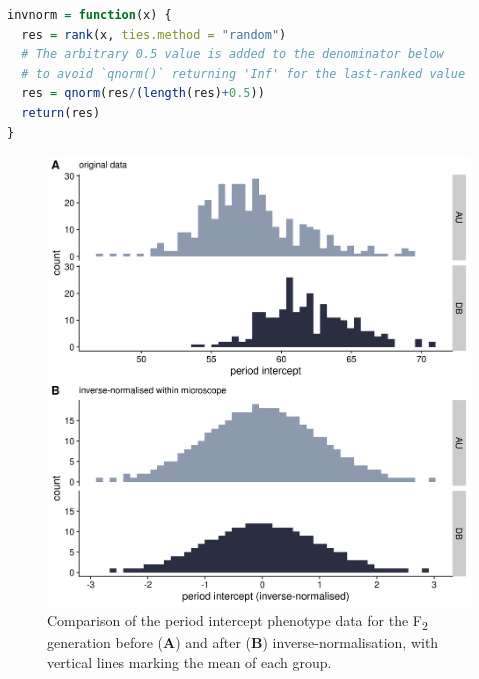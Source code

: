 \documentclass[
]{book}
\begin{document}
\lstset{style=mystyle}
\begin{lstlisting}[language=R, caption=Inverse-normalisation function ]
invnorm = function(x) {
  res = rank(x, ties.method = "random")
  # The arbitrary 0.5 value is added to the denominator below 
  # to avoid `qnorm()` returning 'Inf' for the last-ranked value
  res = qnorm(res/(length(res)+0.5))
  return(res)
}
\end{lstlisting}



\begin{figure}
\includegraphics[width=1\linewidth]{figs/somites/invnorm_intercept} \caption{Comparison of the period intercept phenotype data for the F\textsubscript{2} generation before (\textbf{A}) and after (\textbf{B}) inverse-normalisation, with vertical lines marking the mean of each group.}\label{fig:invnorm-intercept}
\end{figure}
\end{document}
